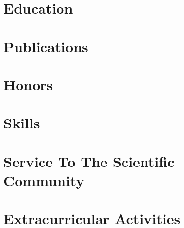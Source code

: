 \documentclass{prometheus_cv}
\begin{document}
\thispagestyle{empty}		%
\pagestyle{fancy}			 %

\vspace*{-1cm}
\centering 


\vspace*{0.4cm}
\section{Education}


\section{Publications}


\section{Honors}


\section{Skills}



\section{Service To The Scientific Community}



\section{Extracurricular Activities}

\end{document}
